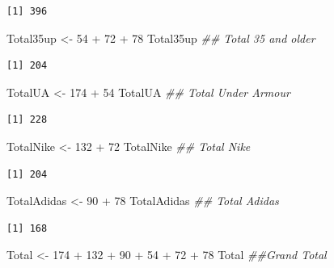 \documentclass[
  letterpaper,
  DIV=11,
  numbers=noendperiod]{scrreprt}
\newenvironment{Shaded}{\begin{snugshade}}{\end{snugshade}}
\newcommand{\DecValTok}[1]{\textcolor[rgb]{0.68,0.00,0.00}{#1}}
\newcommand{\DocumentationTok}[1]{\textcolor[rgb]{0.37,0.37,0.37}{\textit{#1}}}
\newcommand{\NormalTok}[1]{\textcolor[rgb]{0.00,0.23,0.31}{#1}}
\newcommand{\OtherTok}[1]{\textcolor[rgb]{0.00,0.23,0.31}{#1}}
\newcommand{\SpecialCharTok}[1]{\textcolor[rgb]{0.37,0.37,0.37}{#1}}
\begin{document}
\begin{verbatim}
[1] 396
\end{verbatim}

\begin{Shaded}
\begin{Highlighting}[]
\NormalTok{Total35up }\OtherTok{\textless{}{-}} \DecValTok{54} \SpecialCharTok{+} \DecValTok{72} \SpecialCharTok{+} \DecValTok{78}
\NormalTok{Total35up  }\DocumentationTok{\#\# Total 35 and older}
\end{Highlighting}
\end{Shaded}

\begin{verbatim}
[1] 204
\end{verbatim}

\begin{Shaded}
\begin{Highlighting}[]
\NormalTok{TotalUA }\OtherTok{\textless{}{-}} \DecValTok{174} \SpecialCharTok{+} \DecValTok{54}
\NormalTok{TotalUA  }\DocumentationTok{\#\# Total Under Armour}
\end{Highlighting}
\end{Shaded}

\begin{verbatim}
[1] 228
\end{verbatim}

\begin{Shaded}
\begin{Highlighting}[]
\NormalTok{TotalNike }\OtherTok{\textless{}{-}} \DecValTok{132} \SpecialCharTok{+} \DecValTok{72}
\NormalTok{TotalNike  }\DocumentationTok{\#\# Total Nike}
\end{Highlighting}
\end{Shaded}

\begin{verbatim}
[1] 204
\end{verbatim}

\begin{Shaded}
\begin{Highlighting}[]
\NormalTok{TotalAdidas }\OtherTok{\textless{}{-}} \DecValTok{90} \SpecialCharTok{+} \DecValTok{78}
\NormalTok{TotalAdidas  }\DocumentationTok{\#\# Total Adidas}
\end{Highlighting}
\end{Shaded}

\begin{verbatim}
[1] 168
\end{verbatim}

\begin{Shaded}
\begin{Highlighting}[]
\NormalTok{Total }\OtherTok{\textless{}{-}} \DecValTok{174} \SpecialCharTok{+} \DecValTok{132} \SpecialCharTok{+} \DecValTok{90} \SpecialCharTok{+} \DecValTok{54} \SpecialCharTok{+} \DecValTok{72} \SpecialCharTok{+} \DecValTok{78}
\NormalTok{Total  }\DocumentationTok{\#\#Grand Total }
\end{Highlighting}
\end{Shaded}
\end{document}
